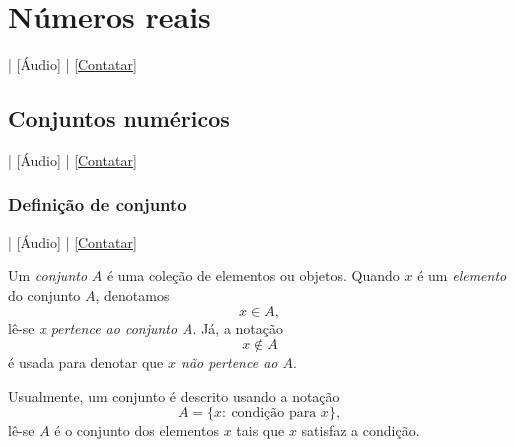 
\chapter{Números reais}\label{cap_numreal}
\thispagestyle{fancy}

\begin{flushright}
  [Vídeo] | [Áudio] | \href{https://phkonzen.github.io/notas/contato.html}{[Contatar]}
\end{flushright}

\section{Conjuntos numéricos}\label{cap_numreal_sec_funconj}

\begin{flushright}
  [Vídeo] | [Áudio] | \href{https://phkonzen.github.io/notas/contato.html}{[Contatar]}
\end{flushright}

\subsection{Definição de conjunto}

\begin{flushright}
  [Vídeo] | [Áudio] | \href{https://phkonzen.github.io/notas/contato.html}{[Contatar]}
\end{flushright}

Um \emph{conjunto} $A$ é uma coleção de elementos ou objetos. Quando $x$ é um \emph{elemento} do conjunto $A$, denotamos
\begin{equation}
  x\in A,
\end{equation}
lê-se \emph{x pertence ao conjunto A}. Já, a notação
\begin{equation}
  x\not\in A
\end{equation}
é usada para denotar que \emph{$x$ não pertence ao $A$}.

Usualmente, um conjunto é descrito usando a notação
\begin{equation}
  A = \{x:~\text{condição para }x\},
\end{equation}
lê-se $A$ é o conjunto dos elementos $x$ tais que $x$ satisfaz a condição.

